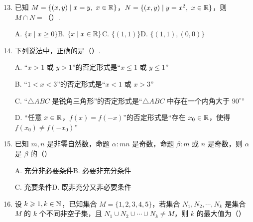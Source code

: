 \documentclass[a4paper,11pt]{article}
\begin{document}

\begin{enumerate}
\setcounter{enumi}{12}

\item 已知 $M=\{(x,y)\mid x=y,\ x\in\R\}$，$N=\{(x,y)\mid y=x^2,\ x\in\R\}$，则 $M\cap N=$（\quad）.

A. $\{x\mid x\geqslant 0\}$\qquad B. $\{x\mid x\in\mathbb{R}\}$\qquad C. $\{(1,1)\}$\qquad D. $\{(1,1),(0,0)\}$


\ifanswer
\solbegin
{}
\solend

\fi

\item 下列说法中，正确的是（\quad）.

A. “$x>1$ 或 $y>1$”的否定形式是“$x\leqslant 1$ 或 $y\leqslant 1$”

B. “$1<x<3$”的否定形式是“$x<1$ 或 $x>3$”

C. “$\triangle ABC$ 是锐角三角形”的否定形式是“$\triangle ABC$ 中存在一个内角大于 $90^\circ$”

D. “任意 $x\in\mathbb{R}$，$f(x)=f(-x)$”的否定形式是“存在 $x_0\in\mathbb{R}$，使得 $f(x_0)\neq f(-x_0)$”


\item 已知 $m,n$ 是非零自然数，命题 $\alpha:mn$ 是奇数，命题 $\beta:m$ 或 $n$ 是奇数，则 $\alpha$ 是 $\beta$ 的（\quad）

A. 充分非必要条件\qquad B. 必要非充分条件

C. 充要条件\qquad D. 既非充分又非必要条件


\ifanswer
\solbegin
{}
\solend

\fi

\item 设 $k\geqslant 1,k\in\mathbb{N}$，已知集合 $M=\{1,2,3,4,5\}$，若集合 $N_1,N_2,\cdots,N_k$ 是集合 $M$ 的 $k$ 个不同非空子集，且 $N_1\cup N_2\cup\cdots\cup N_k\neq M$，则 $k$ 的最大值为（\quad）


\end{enumerate}
\end{document}
